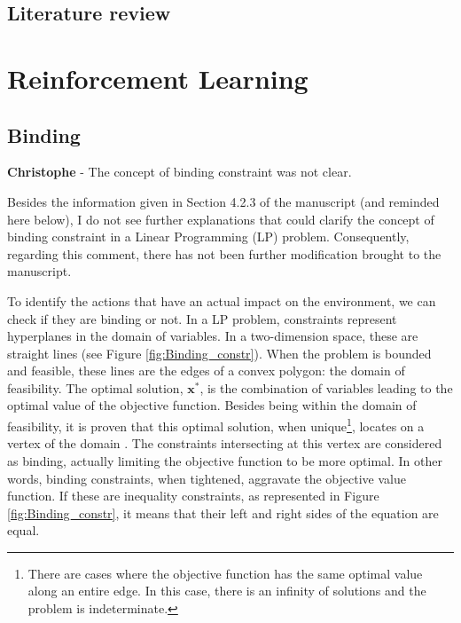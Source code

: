 \documentclass[12pt,a4paper]{article}
\begin{document}
\subsection{Literature review}
\label{Intro_lit_review}



\section{Reinforcement Learning}
\label{RL}

\subsection{Binding}
\label{RL_binding}

\begin{mdframed}[style=comment] %
{\color{violet} \textbf{Christophe}} - The concept of binding constraint was not clear.
\end{mdframed}

\noindent
Besides the information given in Section 4.2.3 of the manuscript (and reminded here below), I do not see further explanations that could clarify the concept of binding constraint in a Linear Programming (LP) problem. Consequently, regarding this comment, there has not been further modification brought to the manuscript.


\begin{mdframed}[style=manuscript] %
To identify the actions that have an actual impact on the environment, we can check if they are binding or not. In a LP problem, constraints represent hyperplanes in the domain of variables. In a two-dimension space, these are straight lines (see Figure \ref{fig:Binding_constr}). When the problem is bounded and feasible, these lines are the edges of a convex polygon: the domain of feasibility. The optimal solution, $\textbf{x}^*$, is the combination of variables leading to the optimal value of the objective function. Besides being within the domain of feasibility, it is proven that this optimal solution, when unique\footnote{There are cases where the objective function has the same optimal value along an entire edge. In this case, there is an infinity of solutions and the problem is indeterminate.}, locates on a vertex of the domain \cite{bertsimas1997introduction}. The constraints intersecting at this vertex are considered as binding, actually limiting the objective function to be more optimal. In other words, binding constraints, when tightened, aggravate the objective value function. If these are inequality constraints, as represented in Figure \ref{fig:Binding_constr}, it means that their left and right sides of the equation are equal.
\end{mdframed}
\end{document}
